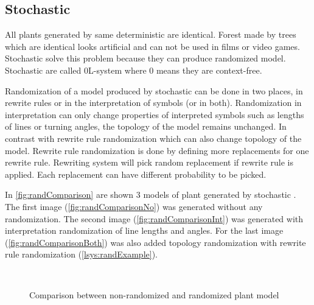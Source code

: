 \subsection{Stochastic \lsystems}

\newcommand{\zerolsystem}{\mbox{0L-system}\xspace}
\newcommand{\zerolsystems}{\mbox{0L-systems}\xspace}

All plants generated by same deterministic \lsystem are identical.
Forest made by trees which are identical looks artificial and can not be used in films or video games.
Stochastic \lsystems solve this problem because they can produce randomized model.
Stochastic \lsystems are called \zerolsystem where 0 means they are context-free.


Randomization of a model produced by stochastic \lsystem can be done in two places, in rewrite rules or in the interpretation of symbols (or in both).
Randomization in interpretation can only change properties of interpreted symbols such as lengths of lines or turning angles, the topology of the model remains unchanged.
In contrast with rewrite rule randomization which can also change topology of the model.
Rewrite rule randomization is done by defining more replacements for one rewrite rule.
Rewriting system will pick random replacement if rewrite rule is applied.
Each replacement can have different probability to be picked.

In \autoref{fig:randComparison} are shown 3 models of plant generated by stochastic \lsystems.
The first image (\ref{fig:randComparisonNo}) was generated without any randomization.
The second image (\ref{fig:randComparisonInt}) was generated with interpretation randomization of line lengths and angles.
For the last image (\ref{fig:randComparisonBoth}) was also added topology randomization with rewrite rule randomization (\autoref{lsys:randExample}).

\begin{figure}[h]
	\centering
	 ~
	 ~
	\caption{Comparison between non-randomized and randomized plant model}
	\label{fig:randComparison}
\end{figure}

